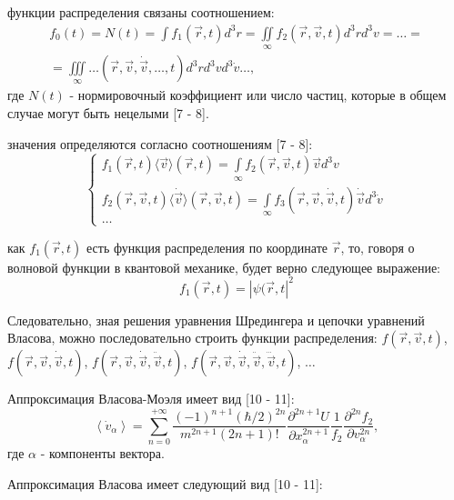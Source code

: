 \documentclass[a4paper,14pt]{article}
\begin{document}
 функции распределения связаны соотношением:
\begin{eqnarray} 
f_0(t) =N(t)=\int f_1(\vec r, t) d^3 r=\iint\limits_{\infty} f_2(\vec r, \vec v, t) d^3 r d^3 v=\ldots=  \nonumber\\ =\iiint\limits_{\infty} \ldots (\vec r, \vec v, \dot{\vec v}, \ldots, t) d^3r d^3 v d^3 \dot v \ldots,
\end{eqnarray}
где  $N(t)$ - нормировочный коэффициент или число частиц, которые в общем случае могут быть нецелыми [7 - 8].

 значения определяются согласно соотношениям [7 - 8]:
\begin{equation} 
\begin{cases}
f_1(\vec r, t)\langle{\vec{v}}\rangle(\vec{r}, t)=\int\limits_{\infty} f_{2}(\vec{r}, \vec{v},  t) {\vec{v}} d^{3} v \\ 
f_2(\vec r, \vec v, t)\langle\dot{\vec{v}}\rangle(\vec{r}, \vec{v}, t)=\int\limits_{\infty} f_{3}(\vec{r}, \vec{v}, \dot{\vec{v}}, t) \dot{\vec{v}} d^{3} \dot{v} \\ \ldots
\end{cases}
\end{equation} 

 как $f_1(\vec r, t)$ есть функция распределения по координате $\vec r $, то, говоря о волновой функции в квантовой механике, будет верно следующее выражение:
\begin{equation}
f_1(\vec r,t) = |\psi(\vec r, t|^2\label{ref1}
\end{equation}

Следовательно, зная решения уравнения Шредингера и цепочки уравнений Власова, можно последовательно строить функции распределения: $f(\vec r, \vec v,t)$, $ f(\vec r, \vec v,\dot {\vec v} , t)$, $ f(\vec r, \vec v,\dot {\vec v} , \ddot{\vec v}, t)$, $ f(\vec r, \vec v,\dot {\vec v} , \ddot{\vec v}, \dddot{\vec v}, t)$, $\ldots$
 
Аппроксимация Власова-Моэля имеет вид [10 - 11]:
 \begin{equation} 
\left\langle\dot{v}_{\alpha}\right\rangle=\sum_{n=0}^{+\infty} \frac{(-1)^{n+1}(\hbar / 2)^{2 n}}{m^{2 n+1}(2 n+1) !} \frac{\partial^{2 n+1} U}{\partial x_{\alpha}^{2 n+1}} \frac{1}{f_{2}} \frac{\partial^{2 n} f_{2}}{\partial v_{\alpha}^{2 n}},
\end{equation}
где $\alpha$ - компоненты вектора. 

Аппроксимация Власова имеет следующий вид [10 - 11]:
\end{document}
